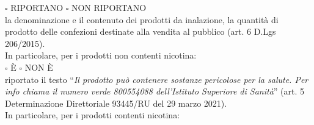 \documentclass[12pt]{article}
\begin{document}
\begin{math}\square\end{math} RIPORTANO \begin{math}\square\end{math} NON RIPORTANO\\
la denominazione e il contenuto dei prodotti da inalazione, la quantità di prodotto delle confezioni destinate alla vendita al pubblico (art. 6 D.Lgs 206/2015).\\
In particolare, per i prodotti non contenti nicotina:\\
\begin{math}\square\end{math} È \begin{math}\square\end{math} NON È\\
riportato il testo “\textit{Il prodotto può contenere sostanze pericolose per la salute. Per info chiama il numero verde 800554088 dell’Istituto Superiore di Sanità}” (art. 5 Determinazione Direttoriale 93445/RU del 29 marzo 2021).\\
In particolare, per i prodotti contenti nicotina:
\end{document}

